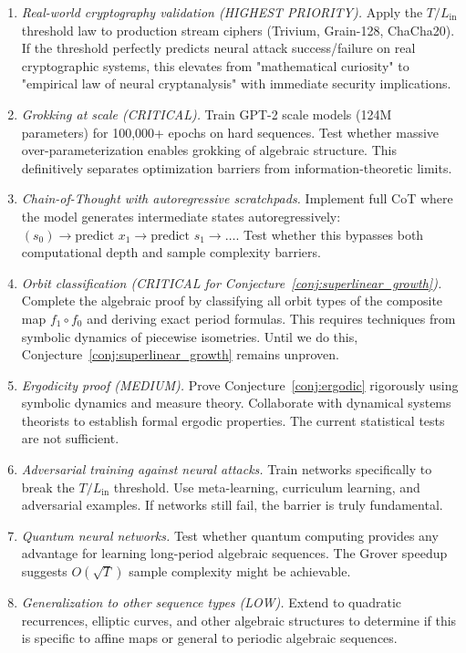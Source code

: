 \documentclass[11pt]{article}
\theoremstyle{plain}
\theoremstyle{definition}
\begin{document}
\begin{enumerate}[leftmargin=2em,itemsep=2pt]
  \item \textit{Real-world cryptography validation (HIGHEST PRIORITY).} Apply the $T/L_{\mathrm{in}}$ threshold law to production stream ciphers (Trivium, Grain-128, ChaCha20). If the threshold perfectly predicts neural attack success/failure on real cryptographic systems, this elevates from "mathematical curiosity" to "empirical law of neural cryptanalysis" with immediate security implications.
  
  \item \textit{Grokking at scale (CRITICAL).} Train GPT-2 scale models (124M parameters) for 100,000+ epochs on hard sequences. Test whether massive over-parameterization enables grokking of algebraic structure. This definitively separates optimization barriers from information-theoretic limits.
  
  \item \textit{Chain-of-Thought with autoregressive scratchpads.} Implement full CoT where the model generates intermediate states autoregressively: $(s_0) \to \text{predict } x_1 \to \text{predict } s_1 \to \ldots$. Test whether this bypasses both computational depth and sample complexity barriers.
  
  \item \textit{Orbit classification (CRITICAL for Conjecture~\ref{conj:superlinear_growth}).} Complete the algebraic proof by classifying all orbit types of the composite map $f_1 \circ f_0$ and deriving exact period formulas. This requires techniques from symbolic dynamics of piecewise isometries. Until we do this, Conjecture~\ref{conj:superlinear_growth} remains unproven.
  
  \item \textit{Ergodicity proof (MEDIUM).} Prove Conjecture~\ref{conj:ergodic} rigorously using symbolic dynamics and measure theory. Collaborate with dynamical systems theorists to establish formal ergodic properties. The current statistical tests are not sufficient.
  
  \item \textit{Adversarial training against neural attacks.} Train networks specifically to break the $T/L_{\mathrm{in}}$ threshold. Use meta-learning, curriculum learning, and adversarial examples. If networks still fail, the barrier is truly fundamental.
  
  \item \textit{Quantum neural networks.} Test whether quantum computing provides any advantage for learning long-period algebraic sequences. The Grover speedup suggests $O(\sqrt{T})$ sample complexity might be achievable.
  
  \item \textit{Generalization to other sequence types (LOW).} Extend to quadratic recurrences, elliptic curves, and other algebraic structures to determine if this is specific to affine maps or general to periodic algebraic sequences.
\end{enumerate}
\end{document}
